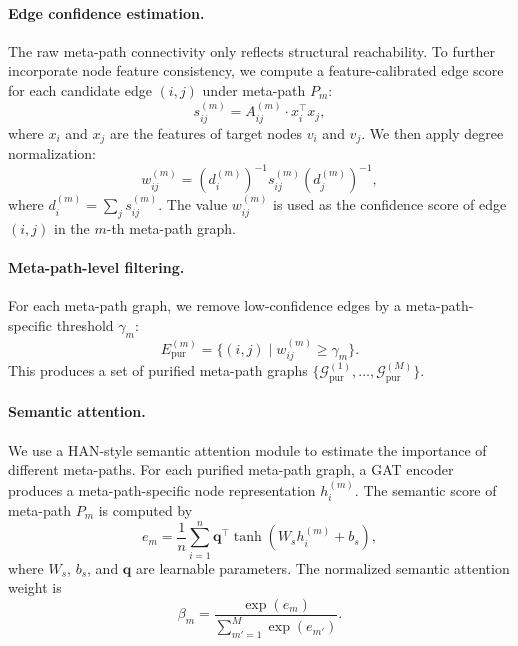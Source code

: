 \paragraph{Edge confidence estimation.}
The raw meta-path connectivity only reflects structural reachability. To further incorporate node feature consistency, we compute a feature-calibrated edge score for each candidate edge $(i,j)$ under meta-path $P_m$:
\begin{equation}
s_{ij}^{(m)}
=
A_{ij}^{(m)} \cdot x_i^{\top}x_j,
\end{equation}
where $x_i$ and $x_j$ are the features of target nodes $v_i$ and $v_j$. We then apply degree normalization:
\begin{equation}
w_{ij}^{(m)}
=
(d_i^{(m)})^{-1}
s_{ij}^{(m)}
(d_j^{(m)})^{-1},
\end{equation}
where $d_i^{(m)}=\sum_j s_{ij}^{(m)}$. The value $w_{ij}^{(m)}$ is used as the confidence score of edge $(i,j)$ in the $m$-th meta-path graph.

\paragraph{Meta-path-level filtering.}
For each meta-path graph, we remove low-confidence edges by a meta-path-specific threshold $\gamma_m$:
\begin{equation}
E^{(m)}_{\mathrm{pur}}
=
\{(i,j)\mid w_{ij}^{(m)} \geq \gamma_m\}.
\end{equation}
This produces a set of purified meta-path graphs
$\{\mathcal{G}^{(1)}_{\mathrm{pur}},\ldots,\mathcal{G}^{(M)}_{\mathrm{pur}}\}$.

\paragraph{Semantic attention.}
We use a HAN-style semantic attention module to estimate the importance of different meta-paths. For each purified meta-path graph, a GAT encoder produces a meta-path-specific node representation $h_i^{(m)}$. The semantic score of meta-path $P_m$ is computed by
\begin{equation}
e_m
=
\frac{1}{n}
\sum_{i=1}^{n}
\mathbf{q}^{\top}
\tanh(W_s h_i^{(m)} + b_s),
\end{equation}
where $W_s$, $b_s$, and $\mathbf{q}$ are learnable parameters. The normalized semantic attention weight is
\begin{equation}
\beta_m
=
\frac{\exp(e_m)}
{\sum_{m'=1}^{M}\exp(e_{m'})}.
\end{equation}

